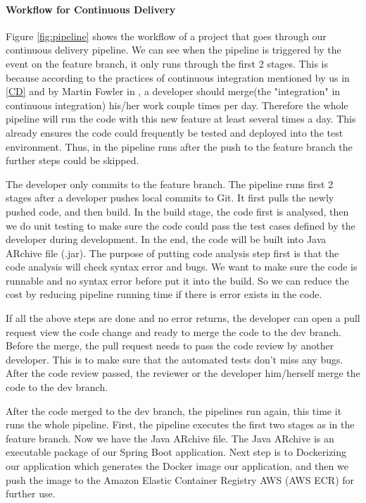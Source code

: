 \paragraph[]{Workflow for Continuous Delivery}
Figure \ref{fig:pipeline} shows the workflow of a project that goes through our continuous delivery pipeline.
We can see when the pipeline is triggered by the event on the feature branch, it only runs through the first 2 stages. This is because according to the practices of continuous integration mentioned by us in \ref{CD} and by Martin Fowler in \cite{fowler2006continuous}, a developer should merge(the "integration" in continuous integration) his/her work couple times per day. Therefore the whole pipeline will run the code with this new feature at least several times a day. This already ensures the code could frequently be tested and deployed into the test environment. Thus, in the pipeline runs after the push to the feature branch the further steps could be skipped. 
\par
 The developer only commits to the feature branch. The pipeline runs first 2 stages after a developer pushes local commits to Git. It first pulls the newly pushed code, and then build. In the build stage, the code first is analysed, then we do unit testing to make sure the code could pass the test cases defined by the developer during development. In the end, the code will be built into Java ARchive file (.jar). The purpose of putting code analysis step first is that the code analysis will check syntax error and bugs. We want to make sure the code is runnable and no syntax error before put it into the build. So we can reduce the cost by reducing pipeline running time if there is error exists in the code. 
\par
If all the above steps are done and no error returns, the developer can open a pull request view the code change and ready to merge the code to the dev branch. Before the merge, the pull request needs to pass the code review by another developer. This is to make sure that the automated tests don't miss any bugs. After the code review passed, the reviewer or the developer him/herself merge the code to the dev branch.  
\par
After the code merged to the dev branch, the pipelines run again, this time it runs the whole pipeline. First, the pipeline executes the first two stages as in the feature branch. Now we have the Java ARchive file. The Java ARchive is an executable package of our Spring Boot application. Next step is to Dockerizing our application which generates the Docker image our application, and then we push the image to the Amazon Elastic Container Registry AWS (AWS ECR) for further use.
